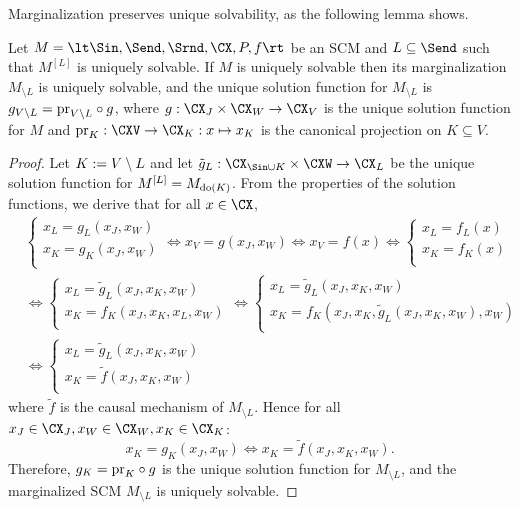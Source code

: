 Marginalization preserves unique solvability, as the following lemma shows.
\begin{Lem}\label{lem:marginalization_preserves_unique_solvability}
  Let $M = \lt \Sin, \Send, \Srnd, \CX, P, f \rt$ be an SCM and $L \subseteq \Send$ such that $M^{[L]}$ is uniquely solvable.
  If $M$ is uniquely solvable then its marginalization $M_{\setminus L}$ is uniquely solvable, and the unique solution function for
  $M_{\setminus L}$ is $g_{V\setminus L} = \mathrm{pr}_{V\setminus L} \circ g$, where $g : \CX_J \times \CX_W \to \CX_V$ is the 
  unique solution function for $M$ and $\pr_K : \CXV \to \CX_K : x \mapsto x_K$ is the canonical projection on $K \subseteq V$.
\end{Lem}
\begin{proof}
  Let $K := V\setminus L$ and let $\tilde{g}_L : \CX_{\Sin \cup K} \times \CXW \to \CX_L$
  be the unique solution function for $M^{[L]} = M_{\operatorname{do}(K)}$.
  From the properties of the solution functions, we derive that
  for all $x \in \CX$,
  \begin{equation*}\begin{split}
  & \begin{cases}
    x_L = g_L(x_J,x_W) \\
    x_K = g_K(x_J,x_W) \\
  \end{cases}
  \iff x_V = g(x_J,x_W) \iff x_V = f(x) 
  \iff \begin{cases}
    x_L = f_L(x) \\
    x_K = f_K(x) \\
  \end{cases} \\
  & \iff \begin{cases}
    x_L = \tilde{g}_L(x_J,x_K,x_W) \\
    x_K = f_K(x_J,x_K,x_L,x_W) \\
  \end{cases}
  \iff \begin{cases}
    x_L = \tilde{g}_L(x_J,x_K,x_W) \\
    x_K = f_K(x_J,x_K,\tilde{g}_L(x_J,x_K,x_W),x_W) \\
  \end{cases} \\
  & \iff \begin{cases}
    x_L = \tilde{g}_L(x_J,x_K,x_W) \\
    x_K = \tilde{f}(x_J,x_K,x_W) \\
  \end{cases}
  \end{split}\end{equation*}
where $\tilde{f}$ is the causal mechanism of $M_{\setminus L}$.
Hence for all $x_J \in \CX_J, x_W \in \CX_W, x_K \in \CX_K$:
$$x_K = g_K(x_J,x_W) \iff x_K = \tilde{f}(x_J,x_K,x_W).$$
Therefore, $g_K = \mathrm{pr}_K \circ g$ is the unique solution function for $M_{\setminus L}$, and the marginalized SCM $M_{\setminus L}$ is uniquely solvable.
\end{proof}
